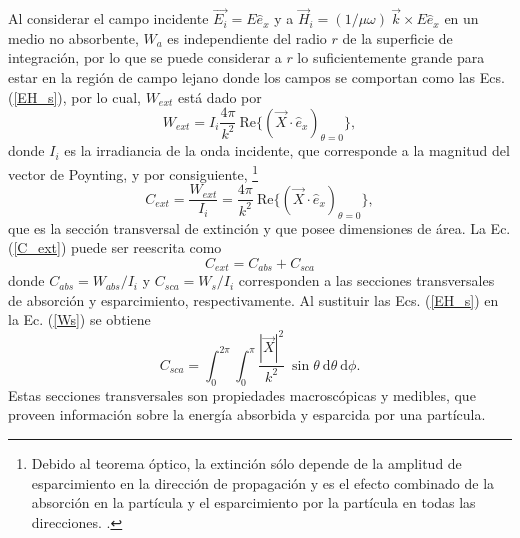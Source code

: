 Al considerar el campo incidente $\Vec{E_i}=E\hat{e}_x$ y a $\Vec{H}_i=(1/\mu \omega)\: \Vec{k} \times E \hat{e}_x$ en un medio no absorbente, $W_a$ es independiente del radio $r$ de la superficie de integración, por lo que se puede considerar a $r$ lo suficientemente grande para estar en la región de campo lejano donde los campos se comportan como las Ecs. (\ref{EH_s}), por lo cual, $W_{ext}$ está dado por \cite{Bohren}
\begin{equation*}
	W_{ext}=I_i\frac{4\pi}{k^2}\:\text{Re}\{(\Vec{X}\cdot\hat{e}_x)_{\theta=0}\},
\end{equation*}
donde $I_i$ es la irradiancia de la onda incidente, que corresponde a la magnitud del vector de Poynting, y por consiguiente, \footnote{Debido al teorema óptico, la extinción sólo depende de la amplitud de esparcimiento en la dirección de propagación y es el efecto combinado de la absorción en la partícula y el esparcimiento por la partícula en todas las direcciones. \cite{Bohren}.}
\begin{equation}
	C_{ext}=\frac{W_{ext}}{I_i}=\frac{4\pi}{k^2}\:\text{Re}\{(\Vec{X}\cdot\hat{e}_x)_{\theta=0}\}, \label{C_ext}
\end{equation}
que es la sección transversal de extinción y que posee dimensiones de área. La Ec. (\ref{C_ext}) puede ser reescrita como \cite{Bohren}
\begin{equation}
	C_{ext}=C_{abs}+C_{sca}
	\label{C}
\end{equation}
donde $C_{abs}=W_{abs}/I_i$ y $C_{sca}=W_s/I_i$ corresponden a las secciones transversales de absorción y esparcimiento, respectivamente. Al sustituir las Ecs. (\ref{EH_s}) en la Ec. (\ref{Ws}) se obtiene
\begin{equation}
	C_{sca}=\int_0^{2\pi}\int_0^{\pi}\frac{|\Vec{X}|^2}{k^2}\:\sin\theta\: \text{d}\theta\:\text{d}\phi.
	\label{C_sca_general}
\end{equation}
Estas secciones transversales son propiedades macroscópicas y medibles, que proveen información sobre la energía absorbida y esparcida por una partícula.  \\

